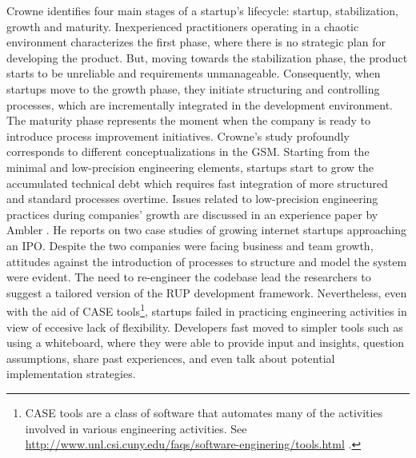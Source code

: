 \documentclass[10pt,journal,letterpaper,compsoc]{IEEEtran}
\begin{document}
Crowne \cite{Crowne2002} identifies four main stages of a startup's lifecycle: startup, stabilization, growth and maturity. Inexperienced practitioners operating in a chaotic environment characterizes the first phase, where there is no strategic plan for developing the product. But, moving towards the stabilization phase, the product starts to be unreliable and requirements unmanageable. Consequently, when startups move to the growth phase, they initiate structuring and controlling processes, which are incrementally integrated in the development environment. The maturity phase represents the moment when the company is ready to introduce process improvement initiatives. Crowne's study profoundly corresponds to different conceptualizations in the GSM. Starting from the minimal and low-precision engineering elements, startups start to grow the accumulated technical debt which requires fast integration of more structured and standard processes overtime.
Issues related to low-precision engineering practices during companies' growth are discussed in an experience paper by Ambler \cite{Ambler2002}. He reports on two case studies of growing internet startups approaching an IPO.%
Despite the two companies were facing business and team growth, attitudes against the introduction of processes to structure and model the system were evident. The need to re-engineer the codebase lead the researchers to suggest a tailored version of the RUP%
development framework. Nevertheless, even with the aid of CASE tools\footnote{CASE tools are a class of software that automates many of the activities involved in various engineering activities. See \url{http://www.unl.csi.cuny.edu/faqs/software-enginering/tools.html} .}, startups failed in practicing engineering activities in view of eccesive lack of flexibility. Developers fast moved to simpler tools such as using a whiteboard, where they were able to provide input and insights, question assumptions, share 
past experiences, and even talk about potential implementation strategies. %
\end{document}
